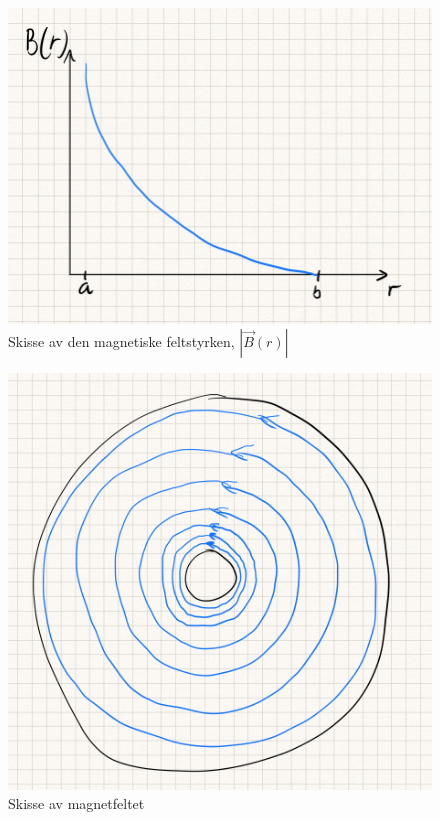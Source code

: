 \documentclass[report,12pt,norsk]{article}
\begin{document}
\begin{center}
\begin{figure}[h!]
        \centering 
        \includegraphics[scale=0.5]{koaksial_skisse.png}
        \caption{Skisse av den magnetiske feltstyrken, $|\vec{B}(r)|$}
\end{figure}
\begin{figure}[h!]
        \centering 
        \includegraphics[scale=0.3]{koaksial_skisse2.png}
        \caption{Skisse av magnetfeltet}
\end{figure}
     
\end{center}
\newpage
\end{document}
